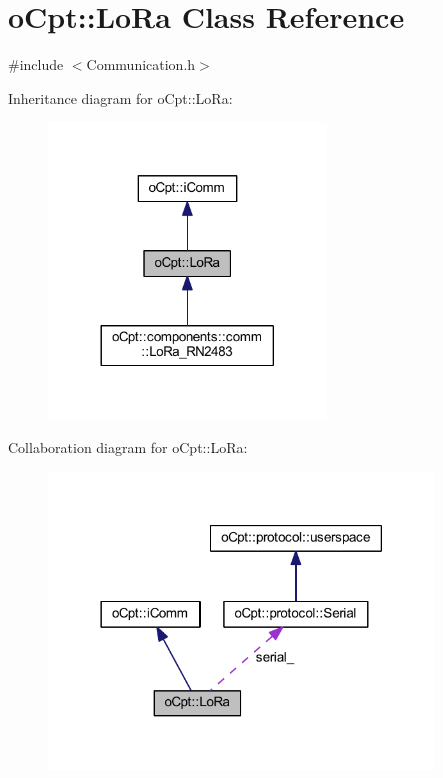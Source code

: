 \hypertarget{classo_cpt_1_1_lo_ra}{}\section{o\+Cpt\+:\+:Lo\+Ra Class Reference}
\label{classo_cpt_1_1_lo_ra}


{\ttfamily \#include $<$Communication.\+h$>$}



Inheritance diagram for o\+Cpt\+:\+:Lo\+Ra\+:
\nopagebreak
\begin{figure}[H]
\begin{center}
\leavevmode
\includegraphics[width=209pt]{classo_cpt_1_1_lo_ra__inherit__graph}
\end{center}
\end{figure}


Collaboration diagram for o\+Cpt\+:\+:Lo\+Ra\+:
\nopagebreak
\begin{figure}[H]
\begin{center}
\leavevmode
\includegraphics[width=290pt]{classo_cpt_1_1_lo_ra__coll__graph}
\end{center}
\end{figure}
